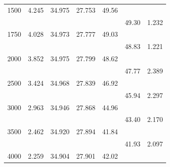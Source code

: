\begin{table}[t!]
\begin{tabular*}{108mm}{@{}rrrrrrl}
1500&   4.245&  34.975& 27.753& 49.56&  \\
 &            &       &       &       & 49.30&  1.232\\
1750&   4.028&  34.973& 27.777& 49.03&  \\
 &            &       &       &       & 48.83&  1.221\\
2000&   3.852&  34.975& 27.799& 48.62&  \\
 &            &       &       &       & 47.77&  2.389\\
2500&   3.424&  34.968& 27.839& 46.92&  \\
 &            &       &       &       & 45.94&  2.297\\
3000&   2.963&  34.946& 27.868& 44.96&  \\
 &            &       &       &       & 43.40&  2.170\\
3500&   2.462&  34.920& 27.894& 41.84&  \\
 &            &       &       &       & 41.93&  2.097\\

4000&   2.259&  34.904& 27.901& 42.02\rule[-1ex]{0mm}{1ex}&  \\
\hline
\end{tabular*} \\[0.5ex]
\vspace{-3.ex}
\end{table}

